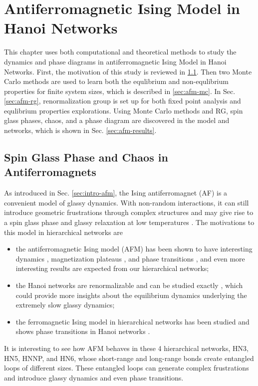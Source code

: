 \chapter{Antiferromagnetic Ising Model  in Hanoi Networks}
\label{chap-afm}
This chapter uses both computational and theoretical methods to study the dynamics and phase diagrams in antiferromagnetic Ising Model in Hanoi Networks.  First, the motivation of this study is reviewed in \ref{sec:amf-glass-intro}. Then two Monte Carlo methods are used to learn both the equlibrium and non-equlibrium properties for finite system sizes, which is described in \ref{sec:afm-mc}. In Sec. \ref{sec:afm-rg}, renormalization group is set up for both fixed point analysis and equlibrium properties explorations.  Using Monte Carlo methods and RG, spin glass phases, chaos, and a phase diagram are discovered in the model and networks, which is shown in Sec. \ref{sec:afm-results}.  

\section{Spin Glass Phase and Chaos in Antiferromagnets}
\label{sec:amf-glass-intro}
As introduced in Sec. \ref{sec:intro-afm}, the Ising antiferromagnet (AF) is a convenient model of glassy dynamics. With non-random interactions, it can still introduce geometric frustrations through complex structures and may give rise to a spin glass phase and glassy relaxation at low temperatures \cite{villain1977spin, herrero2008afm}. The motivations to this model in hierarchical networks are
\begin{itemize}
\item the antiferromagnetic Ising model (AFM) has been shown to have interesting dynamics \cite{shokef2011}, magnetization plateaus \cite{ohanyan2003mag} , and phase transitions \cite{herrero2008afm}, and even more interesting results are expected from our hierarchical networks;
\item the Hanoi networks are renormalizable and can be studied exactly \cite{boettcher2015classification, Boettcher2011HNNP}, which could provide more insights about the equilibrium dynamics underlying the extremely slow glassy dynamics;
\item the ferromagnetic Ising model in hierarchical networks has been studied  and shows phase transitions in Hanoi networks \cite{brunson2014rg}.
\end{itemize}

It is interesting to see how AFM behaves in these 4 hierarchical networks, HN3, HN5, HNNP, and HN6, whose short-range and long-range bonds create entangled loops of different sizes. These entangled loops can generate complex frustrations and introduce glassy dynamics and even phase transitions. 

